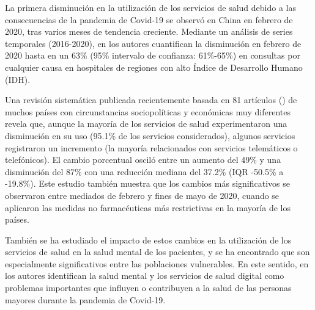 \documentclass[12pt,twoside]{article} %
\begin{document}
La primera disminución en la utilización de los servicios de salud debido a las consecuencias de la pandemia de Covid-19 se observó en China en febrero de 2020, tras varios meses de tendencia creciente. Mediante un análisis de series temporales (2016-2020), en \cite{xiao_impact_2021} los autores cuantifican la disminución en febrero de 2020 hasta en un 63\% (95\% intervalo de confianza: 61\%-65\%) en consultas por cualquier causa en hospitales de regiones con alto Índice de Desarrollo Humano (IDH).

Una revisión sistemática publicada recientemente basada en 81 artículos (\cite{moynihan_impact_2021}) de muchos países con circunstancias sociopolíticas y económicas muy diferentes revela que, aunque la mayoría de los servicios de salud experimentaron una disminución en su uso (95.1\% de los servicios considerados), algunos servicios registraron un incremento (la mayoría relacionados con servicios telemáticos o telefónicos). El cambio porcentual osciló entre un aumento del 49\% y una disminución del 87\% con una reducción mediana del 37.2\% (IQR -50.5\% a -19.8\%). Este estudio también muestra que los cambios más significativos se observaron entre mediados de febrero y fines de mayo de 2020, cuando se aplicaron las medidas no farmacéuticas más restrictivas en la mayoría de los países.

También se ha estudiado el impacto de estos cambios en la utilización de los servicios de salud en la salud mental de los pacientes, y se ha encontrado que son especialmente significativos entre las poblaciones vulnerables. En este sentido, en \cite{bastani_factors_2021} los autores identifican la salud mental y los servicios de salud digital como problemas importantes que influyen o contribuyen a la salud de las personas mayores durante la pandemia de Covid-19.
\end{document}
